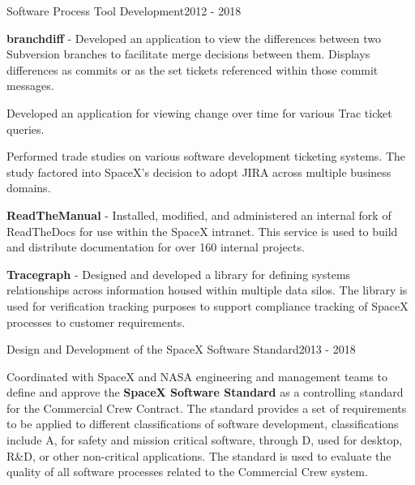 \begin{cventries}
  \cventry
  {Software Process Tool Development}{}{}{2012 - 2018}
  {
    \begin{cvitems}
    \item \textbf{branchdiff} - Developed an application to view the differences between two
      Subversion branches to facilitate merge decisions between them. Displays differences as
      commits or as the set tickets referenced within those commit messages.
    \item Developed an application for viewing change over time for various Trac ticket queries.
    \item Performed trade studies on various software development ticketing systems. The study
      factored into SpaceX's decision to adopt JIRA across multiple business domains.
    \item \textbf{ReadTheManual} - Installed, modified, and administered an internal fork of
      ReadTheDocs for use within the SpaceX intranet. This service is used to build and distribute
      documentation for over 160 internal projects.
    \item \textbf{Tracegraph} - Designed and developed a library for defining systems relationships
      across information housed within multiple data silos. The library is used for verification
      tracking purposes to support compliance tracking of SpaceX processes to customer requirements.
    \end{cvitems}
  }


  \cventry
  {Design and Development of the SpaceX Software Standard}{}{}{2013 - 2018}
  {
    \begin{cvitems}
    \item Coordinated with SpaceX and NASA engineering and management teams to define and approve
      the \textbf{SpaceX Software Standard} as a controlling standard for the Commercial Crew
      Contract. The standard provides a set of requirements to be applied to different
      classifications of software development, classifications include A, for safety and mission
      critical software, through D, used for desktop, R\&D, or other non-critical applications. The
      standard is used to evaluate the quality of all software processes related to the Commercial
      Crew system.
    \end{cvitems}
  }



\end{cventries}
